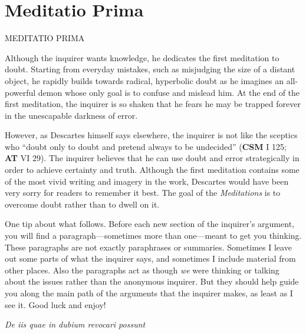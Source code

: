 \chapter{Meditatio Prima}
%
    {\MakeUppercase{Meditatio Prima}}


Although the inquirer wants knowledge, he dedicates the first meditation to doubt. Starting from everyday mistakes, such as misjudging the size of a distant object, he rapidly builds towards radical, hyperbolic doubt as he imagines an all-powerful demon whose only goal is to confuse and mislead him. At the end of the first meditation, the inquirer is so shaken that he fears he may be trapped forever in the unescapable darkness of error.

However, as Descartes himself says elsewhere, the inquirer is not like the sceptics who ``doubt only to doubt and pretend always to be undecided'' (\textbf{CSM} I 125; \textbf{AT} VI 29). The inquirer believes that he can use doubt and error strategically in order to achieve certainty and truth. Although the first meditation contains some of the most vivid writing and imagery in the work, Descartes would have been very sorry for readers to remember it best. The goal of the \textit{Meditations} is to overcome doubt rather than to dwell on it.

One tip about what follows. Before each new section of the inquirer's argument, you will find a paragraph---sometimes more than one---meant to get you thinking. These paragraphs are not exactly paraphrases or summaries. Sometimes I leave out some parts of what the inquirer says, and sometimes I include material from other places. Also the paragraphs act as though \textit{we} were thinking or talking about the issues rather than the anonymous inquirer. But they should help guide you along the main path of the arguments that the inquirer makes, as least as I see it. Good luck and enjoy!

\clearpage

\begin{center}
    \beginnumbering
    \numberlinefalse
    \pstart
    \textit{De iis quae in dubium revocari possunt}
    \pend
    \endnumbering
\end{center}

